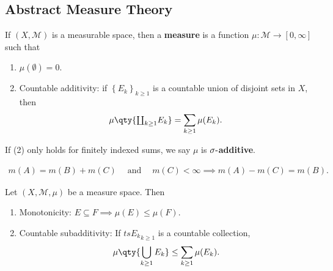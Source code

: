 \hypertarget{abstract-measure-theory}{%
\subsection{Abstract Measure Theory}\label{abstract-measure-theory}}

\begin{definition}

If \((X, {\mathcal{M}})\) is a measurable space, then a \textbf{measure}
is a function \(\mu: {\mathcal{M}}\to [0,\infty]\) such that

\begin{enumerate}
\def\labelenumi{\arabic{enumi}.}
\tightlist
\item
  \(\mu(\emptyset) = 0\).
\item
  Countable additivity: if \(\left\{{E_k}\right\}_{k\geq 1}\) is a
  countable union of disjoint sets in \(X\), then
  \begin{align*}
  \mu\qty{{\textstyle\coprod}_{k\geq 1} E_k} = \sum_{k\geq 1} \mu(E_k)
  .\end{align*}
\end{enumerate}

If (2) only holds for finitely indexed sums, we say \(\mu\) is
\textbf{\(\sigma{\hbox{-}}\)additive}.

\end{definition}

\begin{proposition}

\begin{align*}m(A) = m(B) + m(C) {\quad \operatorname{and} \quad} m(C) < \infty \implies m(A) - m(C) = m(B).\end{align*}

\end{proposition}

\begin{theorem}

Let \((X, {\mathcal{M}}, \mu)\) be a measure space. Then

\begin{enumerate}
\def\labelenumi{\arabic{enumi}.}
\tightlist
\item
  Monotonicity: \(E \subseteq F \implies \mu(E) \leq \mu(F)\).
\item
  Countable subadditivity: If \(ts{E_k}_{k\geq 1}\) is a countable
  collection,
  \begin{align*}
  \mu\qty{\displaystyle\bigcup_{k\geq 1} E_k} \leq \sum_{k\geq 1} \mu(E_k)
  .\end{align*}
\end{enumerate}

\end{theorem}

